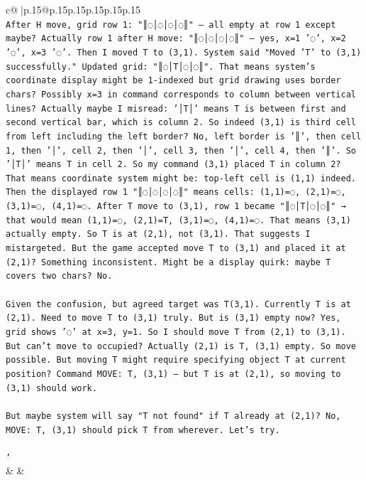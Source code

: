 \documentclass{article}
\begin{document}
{\begin{supertabular}{c@{$\;$}|p{.15\linewidth}@{}p{.15\linewidth}p{.15\linewidth}p{.15\linewidth}p{.15\linewidth}p{.15\linewidth}}
{{{\\ 
\texttt{After H move, grid row 1: "║◌│◌│◌│◌║" — all empty at row 1 except maybe? Actually row 1 after H move: "║◌│◌│◌│◌║" — yes, x=1 '◌', x=2 '◌', x=3 '◌'. Then I moved T to (3,1). System said "Moved 'T' to (3,1) successfully." Updated grid: "║◌│T│◌│◌║". That means system's coordinate display might be 1{-}indexed but grid drawing uses border chars? Possibly x=3 in command corresponds to column between vertical lines? Actually maybe I misread: '│T│' means T is between first and second vertical bar, which is column 2. So indeed (3,1) is third cell from left including the left border? No, left border is '║', then cell 1, then '│', cell 2, then '│', cell 3, then '│', cell 4, then '║'. So '│T│' means T in cell 2. So my command (3,1) placed T in column 2? That means coordinate system might be: top{-}left cell is (1,1) indeed. Then the displayed row 1 "║◌│◌│◌│◌║" means cells: (1,1)=◌, (2,1)=◌, (3,1)=◌, (4,1)=◌. After T move to (3,1), row 1 became "║◌│T│◌│◌║" → that would mean (1,1)=◌, (2,1)=T, (3,1)=◌, (4,1)=◌. That means (3,1) actually empty. So T is at (2,1), not (3,1). That suggests I mistargeted. But the game accepted move T to (3,1) and placed it at (2,1)? Something inconsistent. Might be a display quirk: maybe T covers two chars? No.} \\
\\ 
\texttt{Given the confusion, but agreed target was T(3,1). Currently T is at (2,1). Need to move T to (3,1) truly. But is (3,1) empty now? Yes, grid shows '◌' at x=3, y=1. So I should move T from (2,1) to (3,1). But can't move to occupied? Actually (2,1) is T, (3,1) empty. So move possible. But moving T might require specifying object T at current position? Command MOVE: T, (3,1) — but T is at (2,1), so moving to (3,1) should work.} \\
\\ 
\texttt{But maybe system will say "T not found" if T already at (2,1)? No, MOVE: T, (3,1) should pick T from wherever. Let's try.} \\
\\ 
\texttt{'} \\
            }
        }
    }
    & & \\ \\


\end{supertabular}}
\end{document}
